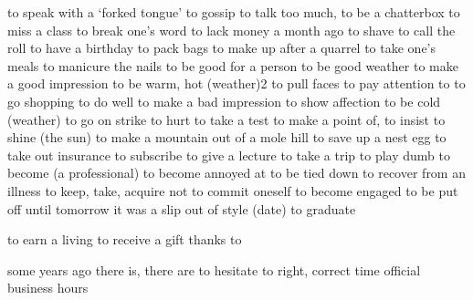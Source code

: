 {to speak with a ‘forked tongue’}
{to gossip}
{to talk too much, to be a chatterbox}
{to miss a class}
{to break one’s word}
{to lack money}
{a month ago}
{to shave}
{to call the roll}
{to have a birthday}
{to pack bags}
{to make up after a quarrel}
{to take one’s meals}
{to manicure the nails}
{to be good for a person}
{to be good weather}
{to make a good impression}
{to be warm, hot (weather)2}
{to pull faces}
{to pay attention to}
{to go shopping}
{to do well}
{to make a bad impression}
{to show affection}
{to be cold (weather)}
{to go on strike}
{to hurt}
{to take a test}
{to make a point of, to insist}
{to shine (the sun)}
{to make a mountain out of a mole hill}
{to save up a nest egg}
{to take out insurance}
{to subscribe}
{to give a lecture}
{to take a trip}
{to play dumb}
{to become (a professional)}
{to become annoyed at}
{to be tied down}
{to recover from an illness}
{to keep, take, acquire}
{not to commit oneself}
{to become engaged}
{to be put off until tomorrow}
{it was a slip}
{out of style (date)}
{to graduate}

{to earn a living}
{to receive a gift}
{thanks to}

{some years ago}
{there is, there are}
{to hesitate to}
{right, correct time}
{official business hours}

